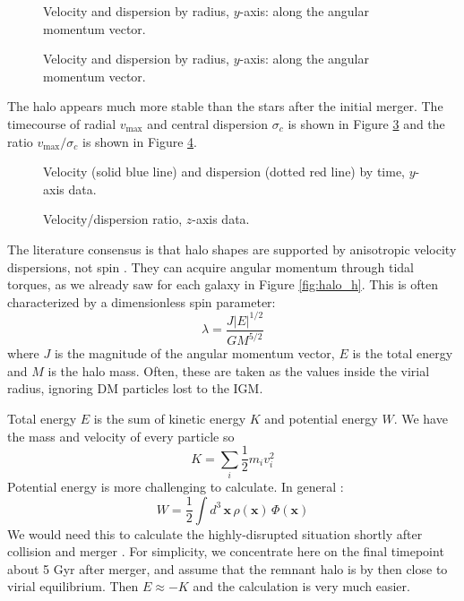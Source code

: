 \documentclass[twocolumn]{aastex63}
\begin{document}
\begin{figure}[htb!]
	\caption{Velocity and dispersion by radius, $y$-axis: along the angular momentum vector.
		\label{fig:rem_dm_disp_y_450}}
\end{figure}

\begin{figure}[htb!]
	\caption{Velocity and dispersion by radius, $y$-axis: along the angular momentum vector.
		\label{fig:rem_dm_disp_y_600}}
\end{figure}

The halo appears much more stable than the stars after the initial merger. The timecourse of radial $v_{\text{max}}$ and central dispersion $\sigma_c$ is shown in Figure \ref{fig:rem_dm_vdisp_tc} and the ratio $v_{\text{max}} / \sigma_c$ is shown in Figure \ref{fig:rem_dm_vdisp_ratio}. 

\begin{figure}[htb!]
	\caption{Velocity (solid blue line) and dispersion (dotted red line) by time, $y$-axis data.
		\label{fig:rem_dm_vdisp_tc}}
\end{figure}


\begin{figure}[htb!]
	\caption{Velocity/dispersion ratio, $z$-axis data.
		\label{fig:rem_dm_vdisp_ratio}}
\end{figure}


The literature consensus is that halo shapes are supported by anisotropic velocity dispersions, not spin \citep{frenk_dark_2012}. They can acquire angular momentum through tidal torques, as we already saw for each galaxy in Figure \ref{fig:halo_h}. This is often characterized by a dimensionless spin parameter:
\[ \lambda = \frac{J |E|^{1/2}}{G M^{5/2}} \]
where $J$ is the magnitude of the angular momentum vector, $E$ is the total energy and $M$ is the halo mass. Often, these are taken as the values inside the virial radius, ignoring DM particles lost to the IGM.

Total energy $E$ is the sum of kinetic energy $K$ and potential energy $W$. We have the mass and velocity of every particle so 
\[ K = \sum_i \frac{1}{2} m_i v_i^2 \]
Potential energy is more challenging to calculate. In general \citep[section 2.1]{binney_galactic_2008}:
\[ W = \frac{1}{2} \int d^3\, \mathbf{x}\, \rho(\mathbf{x})\, \Phi(\mathbf{x}) \]
We would need this to calculate the highly-disrupted situation shortly after collision and merger \citep[section 8.2]{binney_galactic_2008}. For simplicity, we concentrate here on the final timepoint about 5 Gyr after merger, and assume that the remnant halo is by then close to virial equilibrium. Then $E \approx -K$ and the calculation is very much easier.
\end{document}
